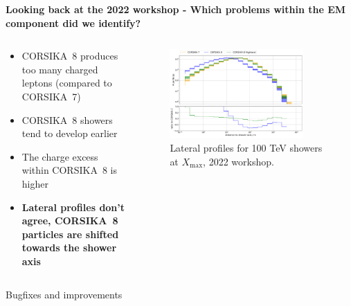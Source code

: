 \documentclass[aspectratio=1610, 9pt]{beamer}
\begin{document}
\begin{frame}

\textbf{Looking back at the 2022 workshop - Which problems within the EM component did we identify?}

    \begin{columns}[onlytextwidth]
        \begin{column}{0.5\textwidth}
            \begin{itemize}
              \item CORSIKA~8 produces too many charged leptons (compared to CORSIKA~7)
              \item CORSIKA~8 showers tend to develop earlier
              \item The charge excess within CORSIKA~8 is higher
              \item \textbf{Lateral profiles don't agree, CORSIKA~8 particles are shifted towards the shower axis}
            \end{itemize}
        \end{column}
        \begin{column}{0.5\textwidth}
            \begin{figure}
                \centering
                \includegraphics[width=0.85\textwidth]{plots/lateral_r_charged_2022.png}
                \caption{Lateral profiles for 100 \si{\tera\electronvolt} showers at $X_\text{max}$, 2022 workshop.}
            \end{figure}
        \end{column}
    \end{columns}
\end{frame}


\begin{frame}
  \begin{center}
    \Huge Bugfixes and improvements
  \end{center}
\end{frame}
\end{document}
